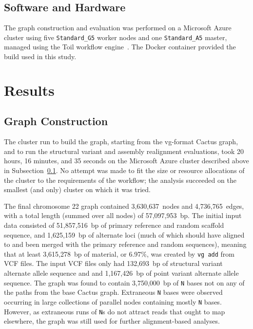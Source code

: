 \subsection{Software and Hardware}
\label{subsec:azurecluster}

\begin{sloppypar}
The graph construction and evaluation was performed on a Microsoft Azure cluster using five \texttt{Standard\_G5} worker nodes and one \texttt{Standard\_A5} master, managed using the Toil workflow engine~\cite{vivian2017toil}. The  Docker container provided the \vg build used in this study.
\end{sloppypar}


\section{Results}

\subsection{Graph Construction}

The cluster run to build the graph, starting from the vg-format Cactus graph, and to run the structural variant and assembly realignment evaluations, took 20 hours, 16 minutes, and 35 seconds on the Microsoft Azure cluster described above in Subsection~\ref{subsec:azurecluster}. No attempt was made to fit the size or resource allocations of the cluster to the requirements of the workflow; the analysis succeeded on the smallest (and only) cluster on which it was tried.

The final chromosome 22 graph contained 3,630,637~nodes and 4,736,765~edges, with a total length (summed over all nodes) of 57,097,953~bp. The initial input data consisted of 51,857,516~bp of primary reference and random scaffold sequence, and 1,625,159~bp of alternate loci (much of which should have aligned to and been merged with the primary reference and random sequences), meaning that at least 3,615,278~bp of material, or 6.97\%, was created by \texttt{vg add} from VCF files. The input VCF files only had 132,693~bp of structural variant alternate allele sequence and and 1,167,426~bp of point variant alternate allele sequence. The graph was found to contain 3,750,000~bp of \texttt{N} bases not on any of the paths from the base Cactus graph. Extraneous \texttt{N} bases were observed occurring in large collections of parallel nodes containing mostly \texttt{N} bases. However, as extraneous runs of \texttt{N}s do not attract reads that ought to map elsewhere, the graph was still used for further alignment-based analyses.

